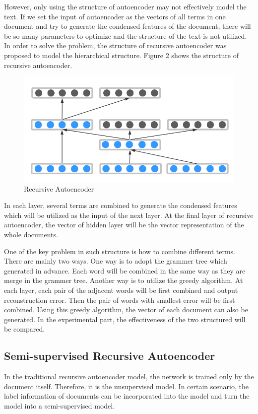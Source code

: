 \documentclass[dvips,9pt]{article}
\begin{document}
However, only using the structure of autoencoder may not effectively model the text. If we set the input of autoencoder as the vectors of all terms in one document and try to generate the condensed features of the document, there will be so many parameters to optimize and the structure of the text is not utilized. In order to solve the problem, the structure of recursive autoencoder was proposed to model the hierarchical structure. Figure 2 shows the structure of recursive autoencoder.
\begin{figure}[ht]
\centering
\includegraphics[width = 1.0\linewidth]{figure/recursiveautoencoder}
\caption{Recursive Autoencoder}
\label{fig:rae}
\end{figure}


In each layer, several terms are combined to generate the condensed features which will be utilized as the input of the next layer. At the final layer of recursive autoencoder, the vector of hidden layer will be the vector representation of the whole documents.

One of the key problem in such structure is how to combine different terms. There are mainly two ways. One way is to adopt the grammer tree which generated in advance. Each word will be combined in the same way as they are merge in the grammer tree. Another way is to utilize the greedy algorithm. At each layer, each pair of the adjacent words will be first combined and output reconstruction error. Then the pair of words with smallest error will be first combined. Using this greedy algorithm, the vector of each document can also be generated. In the experimental part, the effectiveness of the two structured will be compared.

\subsection{Semi-supervised Recursive Autoencoder}
In the traditional recursive autoencoder model, the network is trained only by the document itself. Therefore, it is the unsupervised model. In certain scenario, the label information of documents can be incorporated into the model and turn the model into a semi-supervised model.
\end{document}

